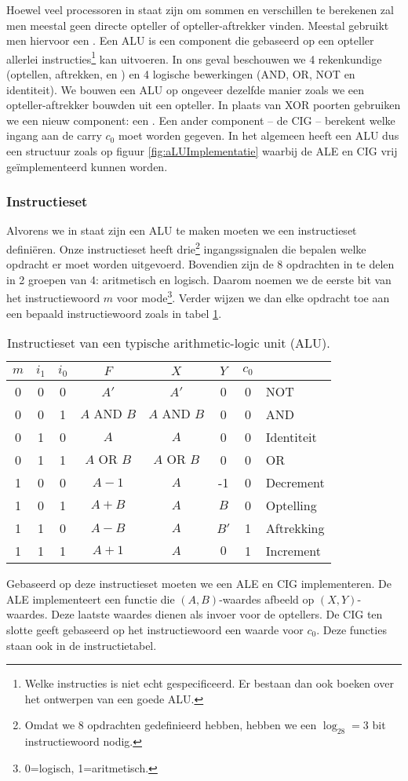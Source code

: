 Hoewel veel processoren in staat zijn om sommen en verschillen te berekenen zal men meestal geen directe opteller of opteller-aftrekker vinden. Meestal gebruikt men hiervoor een . Een ALU is een component die gebaseerd op een opteller allerlei instructies\footnote{Welke instructies is niet echt gespecificeerd. Er bestaan dan ook boeken over het ontwerpen van een goede ALU.} kan uitvoeren. In ons geval beschouwen we 4 rekenkundige (optellen, aftrekken,  en ) en 4 logische bewerkingen (AND, OR, NOT en identiteit). We bouwen een ALU op ongeveer dezelfde manier zoals we een opteller-aftrekker bouwden uit een opteller. In plaats van XOR poorten gebruiken we een nieuw component: een . Een ander component -- de CIG -- berekent welke ingang aan de carry $c_0$ moet worden gegeven. In het algemeen heeft een ALU dus een structuur zoals op figuur \ref{fig:aLUImplementatie} waarbij de ALE en CIG vrij ge\"implementeerd kunnen worden.
\subsubsection{Instructieset}
\label{sss:aLUInstructionSet}
Alvorens we in staat zijn een ALU te maken moeten we een instructieset defini\"eren. Onze instructieset heeft drie\footnote{Omdat we 8 opdrachten gedefinieerd hebben, hebben we een $\log_28=3$ bit instructiewoord nodig.} ingangssignalen die bepalen welke opdracht er moet worden uitgevoerd. Bovendien zijn de 8 opdrachten in te delen in 2 groepen van 4: aritmetisch en logisch. Daarom noemen we de eerste bit van het instructiewoord $m$ voor mode\footnote{0=logisch, 1=aritmetisch.}. Verder wijzen we dan elke opdracht toe aan een bepaald instructiewoord zoals in tabel \ref{tbl:aLUInstructionSet}.
\begin{table}[hbt]
\centering
\begin{tabular}{ccc|c|ccc|l}
$m$&$i_1$&$i_0$&$F$&$X$&$Y$&$c_0$&\\\hline
0&0&0&$A'$&$A'$&0&0&NOT\\
0&0&1&$A\mbox{ AND }B$&$A\mbox{ AND }B$&0&0&AND\\
0&1&0&$A$&$A$&0&0&Identiteit\\
0&1&1&$A\mbox{ OR }B$&$A\mbox{ OR }B$&0&0&OR\\
1&0&0&$A-1$&$A$&-1&0&Decrement\\
1&0&1&$A+B$&$A$&$B$&0&Optelling\\
1&1&0&$A-B$&$A$&$B'$&1&Aftrekking\\
1&1&1&$A+1$&$A$&$0$&1&Increment\\
\end{tabular}
\caption{Instructieset van een typische arithmetic-logic unit (ALU).}
\label{tbl:aLUInstructionSet}
\end{table}
Gebaseerd op deze instructieset moeten we een ALE en CIG implementeren. De ALE implementeert een functie die $\left(A,B\right)$-waardes afbeeld op $\left(X,Y\right)$-waardes. Deze laatste waardes dienen als invoer  voor de optellers. De CIG ten slotte geeft gebaseerd op het instructiewoord een waarde voor $c_0$. Deze functies staan ook in de instructietabel.
